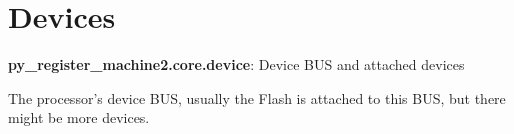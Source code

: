 \documentclass[letterpaper,10pt,english]{sphinxmanual}
\begin{document}
\section{Devices}
\label{core:module-py_register_machine2.core.device}\label{core:devices}
\textbf{py\_register\_machine2.core.device}: Device BUS and attached devices

\begin{fulllineitems}
\label{core:py_register_machine2.core.device.BUS}
The processor's device BUS, usually the Flash is attached to this BUS,
but there might be more devices.

\end{fulllineitems}

\end{document}
